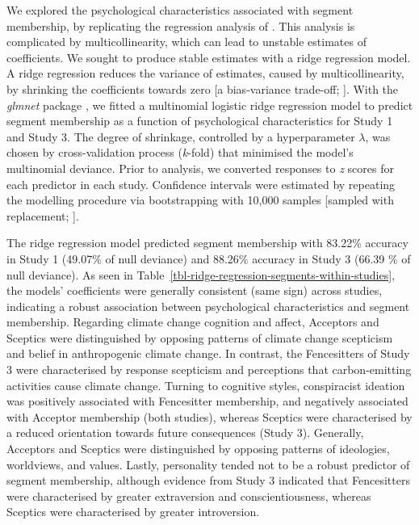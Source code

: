 \documentclass[
  letterpaper,
  DIV=11,
  numbers=noendperiod]{scrartcl}
\begin{document}
We explored the psychological characteristics associated with segment
membership, by replicating the regression analysis of
\citet{andreotta_2022}. This analysis is complicated by
multicollinearity, which can lead to unstable estimates of coefficients.
We sought to produce stable estimates with a ridge regression model. A
ridge regression reduces the variance of estimates, caused by
multicollinearity, by shrinking the coefficients towards zero {[}a
bias-variance trade-off; \citet{james_2021}{]}. With the \emph{glmnet}
package \citep{friedman_2010}, we fitted a multinomial logistic ridge
regression model to predict segment membership as a function of
psychological characteristics for Study 1 and Study 3. The degree of
shrinkage, controlled by a hyperparameter \(\lambda\), was chosen by
cross-validation process (\emph{k}-fold) that minimised the model's
multinomial deviance. Prior to analysis, we converted responses to
\emph{z} scores for each predictor in each study. Confidence intervals
were estimated by repeating the modelling procedure via bootstrapping
with 10,000 samples {[}sampled with replacement; \citet{efron1994}{]}.

The ridge regression model predicted segment membership with 83.22\%
accuracy in Study 1 (49.07\% of null deviance) and 88.26\% accuracy in
Study 3 (66.39 \% of null deviance). As seen in
Table~\ref{tbl-ridge-regression-segments-within-studies}, the models'
coefficients were generally consistent (same sign) across studies,
indicating a robust association between psychological characteristics
and segment membership. Regarding climate change cognition and affect,
Acceptors and Sceptics were distinguished by opposing patterns of
climate change scepticism and belief in anthropogenic climate change. In
contrast, the Fencesitters of Study 3 were characterised by response
scepticism and perceptions that carbon-emitting activities cause climate
change. Turning to cognitive styles, conspiracist ideation was
positively associated with Fencesitter membership, and negatively
associated with Acceptor membership (both studies), whereas Sceptics
were characterised by a reduced orientation towards future consequences
(Study 3). Generally, Acceptors and Sceptics were distinguished by
opposing patterns of ideologies, worldviews, and values. Lastly,
personality tended not to be a robust predictor of segment membership,
although evidence from Study 3 indicated that Fencesitters were
characterised by greater extraversion and conscientiousness, whereas
Sceptics were characterised by greater introversion.
\end{document}
